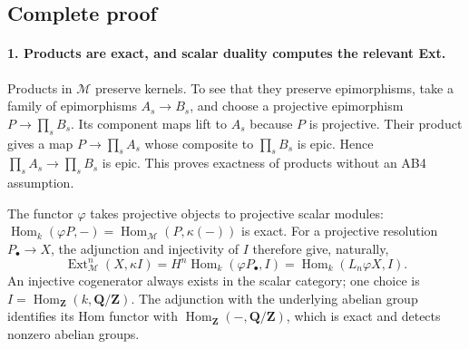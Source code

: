 \subsection{Complete proof}
\paragraph{1. Products are exact, and scalar duality computes the relevant Ext.}
Products in \(\mathcal M\) preserve kernels.  To see that they
preserve epimorphisms, take a family of epimorphisms
\(A_s\to B_s\), and choose a projective epimorphism
\(P\to\prod_sB_s\).  Its component maps lift to \(A_s\)
because \(P\) is projective.  Their product gives a map
\(P\to\prod_sA_s\) whose composite to \(\prod_sB_s\)
is epic.  Hence \(\prod_sA_s\to\prod_sB_s\) is epic.
This proves exactness of products without an AB4 assumption.

The functor \(\varphi\) takes projective objects to projective
scalar modules: \(\operatorname{Hom}_k(\varphi P,-)
=\operatorname{Hom}_{\mathcal M}(P,\kappa(-))\) is exact.
For a projective resolution \(P_\bullet\to X\), the
adjunction and injectivity of \(I\) therefore give, naturally,
\[
 \operatorname{Ext}^n_{\mathcal M}(X,\kappa I)
   =H^n\operatorname{Hom}_k(\varphi P_\bullet,I)
   =\operatorname{Hom}_k(L_n\varphi X,I).                     \tag{SM44.7}
\]
An injective cogenerator always exists in the scalar category;
one choice is \(I=\operatorname{Hom}_{\mathbf Z}(k,\mathbf Q/\mathbf Z)\).
The adjunction with the underlying abelian group identifies its
Hom functor with \(\operatorname{Hom}_{\mathbf Z}(-,\mathbf Q/\mathbf Z)\),
which is exact and detects nonzero abelian groups.

